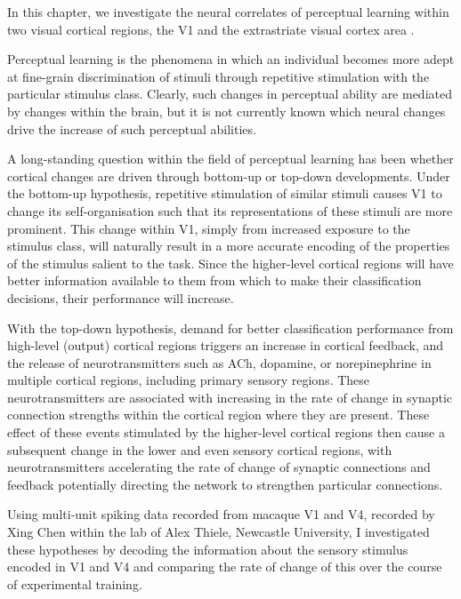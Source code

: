 In this chapter, we investigate the neural correlates of perceptual learning within two visual cortical regions, the \acf{V1} and the extrastriate visual cortex area .

Perceptual learning is the phenomena in which an individual becomes more adept at fine-grain discrimination of stimuli through repetitive stimulation with the particular stimulus class.
Clearly, such changes in perceptual ability are mediated by changes within the brain, but it is not currently known which neural changes drive the increase of such perceptual abilities.

A long-standing question within the field of perceptual learning has been whether cortical changes are driven through bottom-up or top-down developments.
Under the bottom-up hypothesis, repetitive stimulation of similar stimuli causes \ac{V1} to change its self-organisation such that its representations of these stimuli are more prominent.
This change within \ac{V1}, simply from increased exposure to the stimulus class, will naturally result in a more accurate encoding of the properties of the stimulus salient to the task.
Since the higher-level cortical regions will have better information available to them from which to make their classification decisions, their performance will increase.

With the top-down hypothesis, demand for better classification performance from high-level (output) cortical regions triggers an increase in cortical feedback, and the release of neurotransmitters such as \ac{ACh}, dopamine, or norepinephrine in multiple cortical regions, including primary sensory regions.
These neurotransmitters are associated with increasing in the rate of change in synaptic connection strengths within the cortical region where they are present.
These effect of these events stimulated by the higher-level cortical regions then cause a subsequent change in the lower and even sensory cortical regions, with neurotransmitters accelerating the rate of change of synaptic connections and feedback potentially directing the network to strengthen particular connections.

Using multi-unit spiking data recorded from macaque \ac{V1} and \ac{V4}, recorded by Xing Chen within the lab of Alex Thiele, Newcastle University, I investigated these hypotheses by decoding the information about the sensory stimulus encoded in \ac{V1} and \ac{V4} and comparing the rate of change of this over the course of experimental training.
